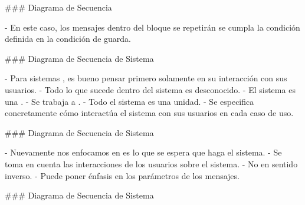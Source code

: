 ### Diagrama de Secuencia


- En este caso, los mensajes dentro del bloque se repetirán  se cumpla la condición definida en
la condición de guarda.

\newline

\vspace{-1em}

### Diagrama de Secuencia de Sistema


- Para sistemas , es bueno pensar primero solamente en su interacción con sus usuarios.
    - Todo lo que sucede dentro del sistema es desconocido.
    - El sistema es una .
- Se trabaja a .
    - Todo el sistema es una unidad.
    - Se especifica concretamente cómo interactúa el sistema con sus usuarios en cada caso de uso.

### Diagrama de Secuencia de Sistema


- Nuevamente nos enfocamos en  es lo que se espera que haga el sistema.
- Se toma en cuenta las interacciones de los usuarios sobre el sistema.
    - No en sentido inverso.
- Puede poner énfasis en los parámetros de los mensajes.

### Diagrama de Secuencia de Sistema

